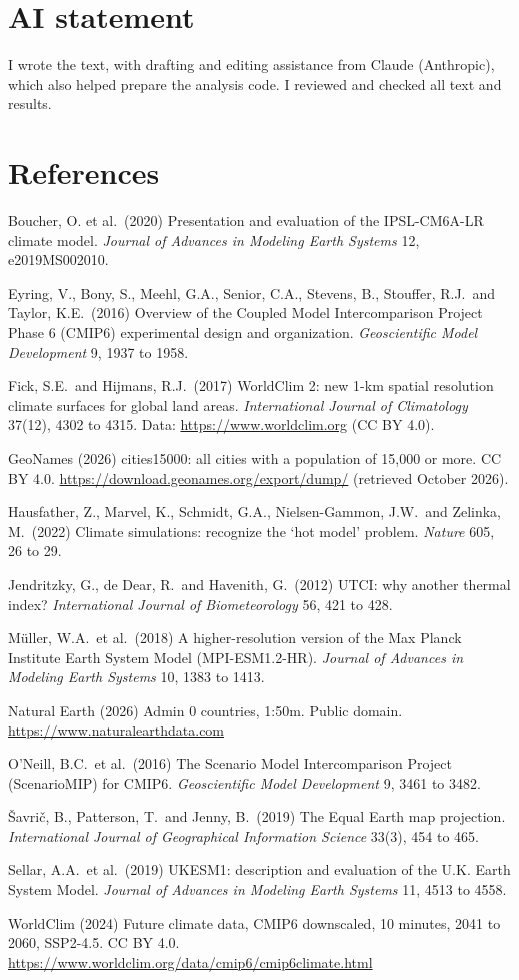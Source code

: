 \documentclass[11pt,a4paper]{article}
\begin{document}
\section*{AI statement}

I wrote the text, with drafting and editing assistance from Claude (Anthropic), which also helped prepare the analysis code. I reviewed and checked all text and results.

\section*{References}
\small
Boucher, O. et al.\ (2020) Presentation and evaluation of the IPSL-CM6A-LR climate model. \emph{Journal of Advances in Modeling Earth Systems} 12, e2019MS002010.

Eyring, V., Bony, S., Meehl, G.A., Senior, C.A., Stevens, B., Stouffer, R.J.\ and Taylor, K.E.\ (2016) Overview of the Coupled Model Intercomparison Project Phase 6 (CMIP6) experimental design and organization. \emph{Geoscientific Model Development} 9, 1937 to 1958.

Fick, S.E.\ and Hijmans, R.J.\ (2017) WorldClim 2: new 1-km spatial resolution climate surfaces for global land areas. \emph{International Journal of Climatology} 37(12), 4302 to 4315. Data: \url{https://www.worldclim.org} (CC BY 4.0).

GeoNames (2026) cities15000: all cities with a population of 15,000 or more. CC BY 4.0. \url{https://download.geonames.org/export/dump/} (retrieved October 2026).

Hausfather, Z., Marvel, K., Schmidt, G.A., Nielsen-Gammon, J.W.\ and Zelinka, M.\ (2022) Climate simulations: recognize the `hot model' problem. \emph{Nature} 605, 26 to 29.

Jendritzky, G., de Dear, R.\ and Havenith, G.\ (2012) UTCI: why another thermal index? \emph{International Journal of Biometeorology} 56, 421 to 428.

M\"uller, W.A.\ et al.\ (2018) A higher-resolution version of the Max Planck Institute Earth System Model (MPI-ESM1.2-HR). \emph{Journal of Advances in Modeling Earth Systems} 10, 1383 to 1413.

Natural Earth (2026) Admin 0 countries, 1:50m. Public domain. \url{https://www.naturalearthdata.com}

O'Neill, B.C.\ et al.\ (2016) The Scenario Model Intercomparison Project (ScenarioMIP) for CMIP6. \emph{Geoscientific Model Development} 9, 3461 to 3482.

\v{S}avri\v{c}, B., Patterson, T.\ and Jenny, B.\ (2019) The Equal Earth map projection. \emph{International Journal of Geographical Information Science} 33(3), 454 to 465.

Sellar, A.A.\ et al.\ (2019) UKESM1: description and evaluation of the U.K. Earth System Model. \emph{Journal of Advances in Modeling Earth Systems} 11, 4513 to 4558.

WorldClim (2024) Future climate data, CMIP6 downscaled, 10 minutes, 2041 to 2060, SSP2-4.5. CC BY 4.0. \url{https://www.worldclim.org/data/cmip6/cmip6climate.html}
\end{document}
